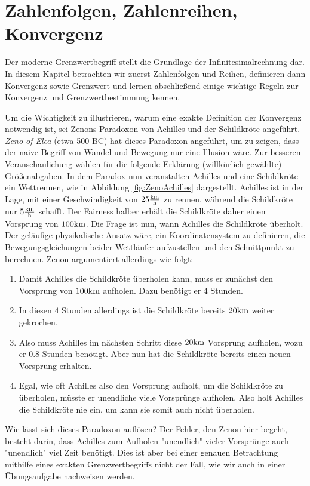 \chapter{Zahlenfolgen, Zahlenreihen, Konvergenz}

Der moderne Grenzwertbegriff stellt die Grundlage der Infinitesimalrechnung dar. In diesem Kapitel betrachten wir zuerst Zahlenfolgen und Reihen, definieren dann Konvergenz sowie Grenzwert und lernen abschließend einige wichtige Regeln zur Konvergenz und Grenzwertbestimmung kennen.

Um die Wichtigkeit zu illustrieren, warum eine exakte Definition der Konvergenz notwendig ist, sei Zenons Paradoxon von Achilles und der Schildkröte angeführt. \emph{Zeno of Elea} (etwa 500 BC) hat dieses Paradoxon angeführt, um zu zeigen, dass der naive Begriff von Wandel und Bewegung nur eine Illusion wäre. Zur besseren Veranschaulichung wählen für die folgende Erklärung (willkürlich gewählte) Größenabgaben. In dem Paradox nun veranstalten Achilles und eine Schildkröte ein Wettrennen, wie in Abbildung \ref{fig:ZenoAchilles} dargestellt. Achilles ist in der Lage, mit einer Geschwindigkeit von $25\frac{\text{km}}{\text{h}}$ zu rennen, während die Schildkröte nur $5\frac{\text{km}}{\text{h}}$ schafft. Der Fairness halber erhält die Schildkröte daher einen Vorsprung von $100\text{km}$. Die Frage ist nun, wann Achilles die Schildkröte überholt. Der geläufige physikalische Ansatz wäre, ein Koordinatensystem zu definieren, die Bewegungsgleichungen beider Wettläufer aufzustellen und den Schnittpunkt zu berechnen. Zenon argumentiert allerdings wie folgt:

\begin{enumerate}
	\item Damit Achilles die Schildkröte überholen kann, muss er zunächst den Vorsprung von $100\text{km}$ aufholen. Dazu benötigt er $4$ Stunden.
	\item In diesen $4$ Stunden allerdings ist die Schildkröte bereits $20\text{km}$ weiter gekrochen.
	\item Also muss Achilles im nächsten Schritt diese $20\text{km}$ Vorsprung aufholen, wozu er $0.8$ Stunden benötigt. Aber nun hat die Schildkröte bereits einen neuen Vorsprung erhalten.
	\item Egal, wie oft Achilles also den Vorsprung aufholt, um die Schildkröte zu überholen, müsste er unendliche viele Vorsprünge aufholen. Also holt Achilles die Schildkröte nie ein, um kann sie somit auch nicht überholen.
\end{enumerate}

Wie lässt sich dieses Paradoxon auflösen? Der Fehler, den Zenon hier begeht, besteht darin, dass Achilles zum Aufholen "unendlich" vieler Vorsprünge auch "unendlich" viel Zeit benötigt. Dies ist aber bei einer genauen Betrachtung mithilfe eines exakten Grenzwertbegriffs nicht der Fall, wie wir auch in einer Übungsaufgabe nachweisen werden.

